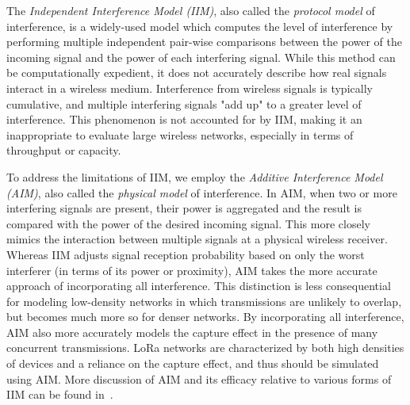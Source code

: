 The {\it Independent Interference Model (IIM)}, also called the {\it protocol model} of interference, is a widely-used model which computes the level of interference by performing multiple independent pair-wise comparisons between the power of the incoming signal and the power of each interfering signal. While this method can be computationally expedient, it does not accurately describe how real signals interact in a wireless medium. Interference from wireless signals is typically cumulative, and multiple interfering signals "add up" to a greater level of interference. This phenomenon is not accounted for by IIM, making it an inappropriate to evaluate large wireless networks, especially in terms of throughput or capacity.

To address the limitations of IIM, we employ the {\it Additive Interference Model (AIM)}, also called the {\it physical model} of interference. In AIM, when two or more interfering signals are present, their power is aggregated and the result is compared with the power of the desired incoming signal. This more closely mimics the interaction between multiple signals at a physical wireless receiver. Whereas IIM adjusts signal reception probability based on only the worst interferer (in terms of its power or proximity), AIM takes the more accurate approach of incorporating all interference. This distinction is less consequential for modeling low-density networks in which transmissions are unlikely to overlap, but becomes much more so for denser networks. By incorporating all interference, AIM also more accurately models the capture effect in the presence of many concurrent transmissions. LoRa networks are characterized by both high densities of devices and a reliance on the capture effect, and thus should be simulated using AIM. More discussion of AIM and its efficacy relative to various forms of IIM can be found in~\cite{iyer2006}.






